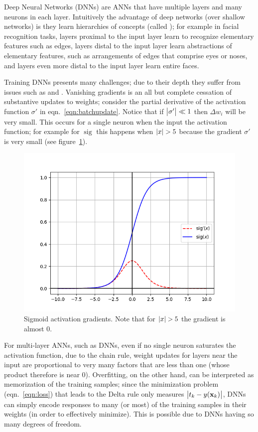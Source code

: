 %
Deep Neural Networks (DNNs) are ANNs that have multiple layers and many neurons in each layer.
%
Intuitively the advantage of deep networks (over shallow networks) is they learn hierarchies of concepts (called ); for example in facial recognition tasks, layers proximal to the input layer learn to recognize elementary features such as edges, layers distal to the input layer learn abstractions of elementary features, such as arrangements of edges that comprise eyes or noses, and layers even more distal to the input layer learn entire faces.

Training DNNs presents many challenges; due to their depth they suffer from issues such as  and .
%
Vanishing gradients is an all but complete cessation of substantive updates to weights; consider the partial derivative of the activation function \(\sigma'\) in eqn.~\eqref{eqn:batchupdate}.
%
Notice that if \(\abs{\sigma'} \ll 1\) then \(\Delta w_i\) will be very small.
%
This occurs for a single neuron when the input  the activation function; for example for \(\operatorname{sig}\) this happens when \(\abs{x} > 5\) because the gradient \(\sigma'\) is very small (see figure~\ref{fig:activs}).
\begin{figure}[!htbp]
    \centering
    \includegraphics[width=\linewidth]{figures/neural_networks/activation_grads.png}
    \caption[]{Sigmoid activation gradients. Note that for \(\abs{x} > 5\) the gradient is almost 0.}\label{fig:activs}
\end{figure}
%
For multi-layer ANNs, such as DNNs, even if no single neuron saturates the activation function,
due to the chain rule, weight updates for layers near the input are proportional to very many factors that are less than one (whose product therefore is near 0).
%
Overfitting, on the other hand, can be interpreted as memorization of the training samples; since the minimization problem (eqn.~\eqref{eqn:loss}) that leads to the Delta rule only measures \(\abs{t_k - y(\mathbf{x}_k)}\), DNNs can simply encode responses to many (or most) of the training samples in their weights (in order to effectively minimize). 
%
This is possible due to DNNs having so many degrees of freedom.

